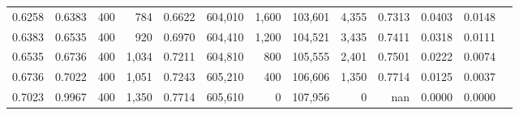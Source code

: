 \begin{tabular}{rrrrrrrrrrrrr}
0.6258 & 0.6383 &    400 &   784 &                                     0.6622 & 604,010 &   1,600 & 103,601 &   4,355 & 0.7313 & 0.0403 & 0.0148 \\
0.6383 & 0.6535 &    400 &   920 &                                     0.6970 & 604,410 &   1,200 & 104,521 &   3,435 & 0.7411 & 0.0318 & 0.0111 \\
0.6535 & 0.6736 &    400 & 1,034 &                                     0.7211 & 604,810 &     800 & 105,555 &   2,401 & 0.7501 & 0.0222 & 0.0074 \\
0.6736 & 0.7022 &    400 & 1,051 &                                     0.7243 & 605,210 &     400 & 106,606 &   1,350 & 0.7714 & 0.0125 & 0.0037 \\
0.7023 & 0.9967 &    400 & 1,350 &                                     0.7714 & 605,610 &       0 & 107,956 &       0 &    nan & 0.0000 & 0.0000 \\
\bottomrule
\end{tabular}
